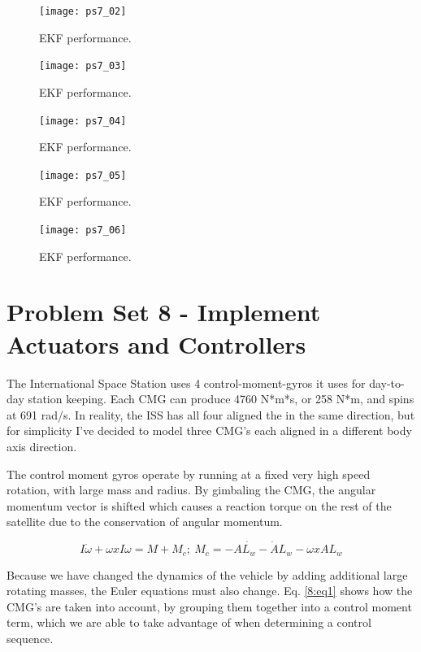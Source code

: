 \documentclass[12pt, letterpaper]{article}
\begin{document}
\begin{figure}[H]
	\centering
	\texttt{[image: ps7\_02]}
	\caption{EKF performance.}
	\label{7:ekf}
\end{figure}


\begin{figure}[H]
	\centering
	\texttt{[image: ps7\_03]}
	\caption{EKF performance.}
	\label{7:ekf}
\end{figure}


\begin{figure}[H]
	\centering
	\texttt{[image: ps7\_04]}
	\caption{EKF performance.}
	\label{7:ekf}
\end{figure}


\begin{figure}[H]
	\centering
	\texttt{[image: ps7\_05]}
	\caption{EKF performance.}
	\label{7:ekf}
\end{figure}


\begin{figure}[H]
	\centering
	\texttt{[image: ps7\_06]}
	\caption{EKF performance.}
	\label{7:ekf}
\end{figure}



\section{Problem Set 8 - Implement Actuators and Controllers}

The International Space Station uses 4 control-moment-gyros it uses for day-to-day station keeping. Each CMG can produce 4760 N*m*s, or 258 N*m, and spins at 691 rad/s. In reality, the ISS has all four aligned the in the same direction, but for simplicity I've decided to model three CMG's each aligned in a different body axis direction.

The control moment gyros operate by running at a fixed very high speed rotation, with large mass and radius. By gimbaling the CMG, the angular momentum vector is shifted which causes a reaction torque on the rest of the satellite due to the conservation of angular momentum.


\begin{equation}
I\dot{\omega} + \omega x I\omega = M + M_c;\ M_c = -A\dot{L_w}-\dot{A}L_w-\omega x AL_w
\label{8:eq1}
\end{equation}

Because we have changed the dynamics of the vehicle by adding additional large rotating masses, the Euler equations must also change. Eq. \ref{8:eq1} shows how the CMG's are taken into account, by grouping them together into a control moment term, which we are able to take advantage of when determining a control sequence. 
\end{document}
